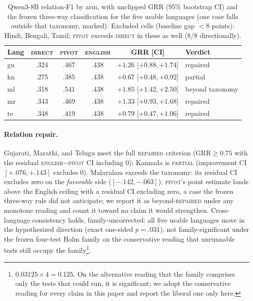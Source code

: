 \documentclass{llncs}
\begin{document}
\begin{table}[t]
\centering
\caption{Qwen3-8B relation-F1 by arm, with unclipped GRR (95\% bootstrap CI)
and the frozen three-way classification for the five usable languages (one
case falls outside that taxonomy, marked). Excluded cells (baseline gap
$<8$ points): Hindi, Bengali, Tamil; \textsc{pivot} exceeds
\textsc{direct} in these as well (8/8 directionally).}
\label{tab:grr}
\begin{tabular}{l@{\hskip 4mm}ccc@{\hskip 5mm}c@{\hskip 5mm}l}
\toprule
Lang & \textsc{direct} & \textsc{pivot} & \textsc{english} & GRR [CI] & Verdict \\
\midrule
gu & .324 & .467 & .438 & $+1.26$ [$+0.88,+1.74$] & repaired \\
kn & .275 & .385 & .438 & $+0.67$ [$+0.48,+0.92$] & partial \\
ml & .318 & .541 & .438 & $+1.85$ [$+1.42,+2.50$] & beyond taxonomy \\
mr & .343 & .469 & .438 & $+1.33$ [$+0.93,+1.68$] & repaired \\
te & .348 & .419 & .438 & $+0.79$ [$+0.47,+1.06$] & repaired \\
\bottomrule
\end{tabular}
\end{table}

\paragraph{Relation repair.} Gujarati, Marathi, and Telugu meet the full
\textsc{repaired} criterion ($\mathrm{GRR} \geq 0.75$ with the residual
\textsc{english}$-$\textsc{pivot} CI including 0); Kannada is
\textsc{partial} (improvement CI $[+.076,+.143]$ excludes 0). Malayalam exceeds the
taxonomy: its residual CI excludes zero on the \emph{favorable} side
($[-.142,-.063]$); \textsc{pivot}'s point estimate lands above the English
ceiling with a residual CI excluding zero, a case the frozen three-way rule
did not anticipate; we report it as beyond-\textsc{repaired} under any
monotone reading and count it toward no claim it would strengthen.
Cross-language consistency holds, family-uncorrected: all five usable
languages move in the hypothesized direction (exact one-sided $p=.031$),
not family-significant under the frozen four-test Holm family on the
conservative reading that unrunnable tests still occupy the
family\footnote{$0.03125\times4=0.125$. On the alternative reading that the
family comprises only the tests that could run, it is significant; we adopt
the conservative reading for every claim in this paper and report the
liberal one only here.}.
\end{document}
